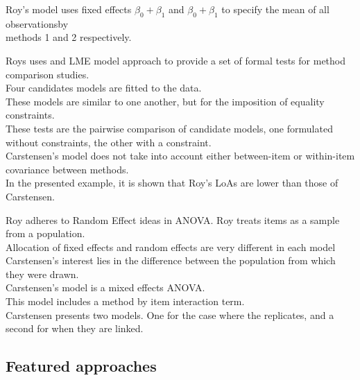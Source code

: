 \documentclass[12pt, a4paper]{report}
\theoremstyle{plain}
\theoremstyle{definition}
\theoremstyle{remark}
\begin{document}
	
	
	
	
	Roy's model uses fixed effects $\beta_0 + \beta_1$ and $\beta_0 + \beta_1$ to specify the mean of all observationsby \\ methods 1 and 2 respectively.
	
	
	Roys uses and LME model approach to provide a set of formal tests for method comparison studies.\\
	
	Four candidates models are fitted to the data.\\
	
	These models are similar to one another, but for the imposition of equality constraints.\\
	
	These tests are the pairwise comparison of candidate models, one formulated without constraints, the other with a constraint.\\
	
	
	Carstensen's model does not take into account either between-item or within-item covariance between methods.\\
	In the presented example, it is shown that Roy's LoAs are lower than those of Carstensen.
	
	
	Roy adheres to Random Effect ideas in ANOVA. Roy treats items as a sample from a population.\\
	
	Allocation of fixed effects and random effects are very different in each model\\
	
	Carstensen's interest lies in the difference between the population from which they were drawn.\\
	
	Carstensen's model is a mixed effects ANOVA.\\
	
	This model includes a method by item interaction term.\\
	
	Carstensen presents two models. One for the case where the replicates, and a second for when they are linked.\\
	
	
	
	
	
	
	
	

	\subsection{Featured approaches}
			
\end{document}
